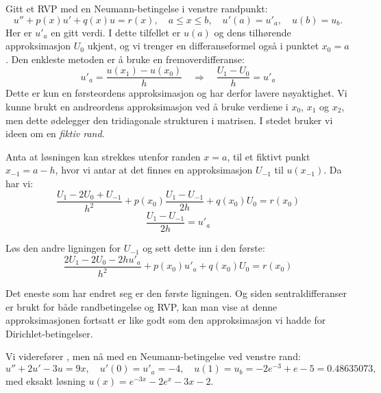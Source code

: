 Gitt et RVP med en Neumann-betingelse i venstre randpunkt:
\[
u'' + p(x)u' + q(x)u = r(x), \quad a \leq x \leq b, \quad u'(a) = u'_a, \quad u(b) = u_b.
\]
Her er \(u'_a\) en gitt verdi. I dette tilfellet er \(u(a)\) og dens tilhørende approksimasjon \(U_0\) ukjent, og vi trenger en differanseformel også i punktet \(x_0 = a\). Den enkleste metoden er å bruke en fremoverdifferanse:
\[
u'_a = \frac{u(x_1) - u(x_0)}{h} \quad \Rightarrow \quad \frac{U_1 - U_0}{h} = u'_a
\]
Dette er kun en førsteordens approksimasjon og har derfor lavere nøyaktighet. Vi kunne brukt en andreordens approksimasjon ved å bruke verdiene i \(x_0\), \(x_1\) og \(x_2\), men dette ødelegger den tridiagonale strukturen i matrisen. I stedet bruker vi ideen om en \textit{fiktiv rand}.

Anta at løsningen kan strekkes utenfor randen \(x = a\), til et fiktivt punkt \(x_{-1} = a - h\), hvor vi antar at det finnes en approksimasjon \(U_{-1}\) til \(u(x_{-1})\). Da har vi:
\[
\frac{U_1 - 2U_0 + U_{-1}}{h^2} + p(x_0)\frac{U_1 - U_{-1}}{2h} + q(x_0)U_0 = r(x_0)
\]
\[
\frac{U_1 - U_{-1}}{2h} = u'_a
\]

Løs den andre ligningen for \(U_{-1}\) og sett dette inn i den første:
\[
\frac{2U_1 - 2U_0 - 2hu'_a}{h^2} + p(x_0)u'_a + q(x_0)U_0 = r(x_0)
\]

Det eneste som har endret seg er den første ligningen. Og siden sentraldifferanser er brukt for både randbetingelse og RVP, kan man vise at denne approksimasjonen fortsatt er like godt som den approksimasjon vi hadde for Dirichlet-betingelser.

\begin{eks}{}
Vi viderefører , men nå med en Neumann-betingelse ved venstre rand:
\[
u'' + 2u' - 3u = 9x, \quad u'(0) = u'_a = -4, \quad u(1) = u_b = -2e^{-3} + e - 5 = 0.48635073,
\]
med eksakt løsning
$u(x) = e^{-3x} - 2e^x - 3x - 2.$ 
\end{eks}

